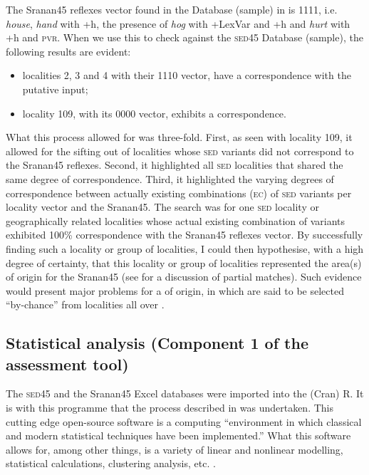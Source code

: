 {{{The Sranan45 reflexes vector found in the  Database (sample) in  is 1111, i.e. \emph{house}, \emph{hand} with +h, the presence of \emph{hog} with +LexVar and +h and \emph{hurt} with +h and \textminus\textsc{pvr}. When we use this to check against the \textsc{sed45} Database (sample), the following results are evident:


\begin{itemize}
\item {localities 2, 3 and 4 with their 1110 vector, have a  correspondence with the putative input;}
\item {locality 109, with its 0000 vector, exhibits a  correspondence.} 
\end{itemize}

What this process allowed for was three-fold. First, as seen with locality 109, it allowed for the sifting out of localities whose \textsc{sed} variants did not correspond to the Sranan45 reflexes. Second, it highlighted all \textsc{sed} localities that shared the same degree of correspondence. Third, it highlighted the varying degrees of correspondence between actually existing combinations (\textsc{ec}) of \textsc{sed} variants per locality vector and the Sranan45. The search was for one \textsc{sed} locality or geographically related localities whose actual existing combination of variants exhibited 100\% correspondence with the Sranan45 reflexes vector. By successfully finding such a locality or group of localities, I could then hypothesise, with a high degree of certainty, that this locality or group of localities represented the area(s) of origin for the Sranan45 (see  for a discussion of partial matches). Such evidence would present major problems for a  of origin, in which  are said to be selected ``by-chance'' from localities all over .

\subsection{Statistical analysis (Component 1 of the assessment tool)} \label{3.4.3}
The \textsc{sed45} and the Sranan45 Excel databases were imported into the  (Cran) R. It is with this programme that the process described in  was undertaken. This cutting edge open-source software is a computing ``environment in which classical and modern statistical techniques have been implemented.'' What this software allows for, among other things, is a variety of linear and nonlinear modelling, statistical calculations, clustering analysis, etc. \citep{R11}.

}}}
